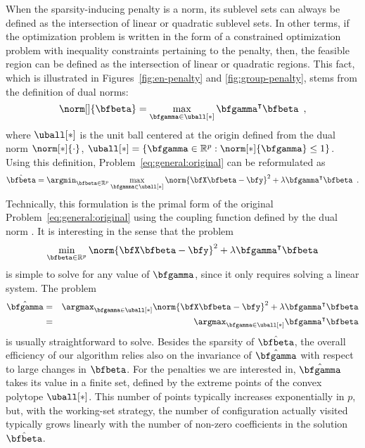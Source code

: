 When the sparsity-inducing penalty is a norm, its sublevel sets can always be
defined as the intersection of linear or quadratic sublevel sets.  In other
terms, if the optimization problem is written in the form of a constrained
optimization problem with inequality constraints pertaining to the penalty,
then, the feasible region can be defined as the intersection of linear or
quadratic regions. 
This fact, which is illustrated in Figures~\ref{fig:en-penalty} and
\ref{fig:group-penalty}, stems from the definition of dual norms:
%
\begin{equation*}%
  \norm[]{\bfbeta} = \max_{\bfgamma\in\uball[*]} \bfgamma^\intercal \bfbeta
  \enspace,
\end{equation*}
where $\uball[*]$ is the unit ball centered at the origin defined from the dual
norm $\norm[*]{\cdot}$,
$\uball[*]=\left\{\bfgamma\in\mathbb{R}^p:\norm[*]{\bfgamma}\leq 1\right\}$.
Using this definition, Problem~\eqref{eq:general:original} can be reformulated
as
%
\begin{equation}\label{eq:general:primal}
  \hat{\bfbeta} = \argmin_{\bfbeta\in\mathbb{R}^p} 
  \max_{\bfgamma\in\uball[*]}
    \norm{\bfX \bfbeta - \bfy}^2 + 
    \lambda \bfgamma^\intercal \bfbeta
  \enspace. 
\end{equation}
%
Technically, this formulation is the primal form of the original 
Problem~\eqref{eq:general:original} using the coupling function defined by the 
dual norm \citep[see e.g.][]{Gilbert16, Bonnans06}. 
It is interesting in the sense that the problem
%
\begin{equation*}
  \min_{\bfbeta\in\mathbb{R}^p} 
  \norm{\bfX \bfbeta - \bfy}^2 + 
  \lambda \bfgamma^\intercal \bfbeta
\end{equation*}
%
is simple to solve for any value of $\bfgamma$, since it only requires solving 
a linear system.
The problem
%
\begin{eqnarray}
  \hat{\bfgamma} & = & \argmax_{\bfgamma\in\uball[*]}
    \norm{\bfX \bfbeta - \bfy}^2 + 
    \lambda \bfgamma^\intercal \bfbeta \nonumber \\
     & = & \argmax_{\bfgamma\in\uball[*]}
    \bfgamma^\intercal \bfbeta \label{eq:optimal_gamma}
\end{eqnarray}
%
is usually straightforward to solve.
Besides the sparsity of $\hat{\bfbeta}$, the overall efficiency of our algorithm
relies also on the invariance of $\hat{\bfgamma}$ with respect to
large changes in $\bfbeta$. 
For the penalties we are interested in, $\hat{\bfgamma}$ takes its value in a
finite set, defined by the extreme points of the convex polytope $\uball[*]$.
This number of points typically increases exponentially in $p$, but, with the working-set
strategy, the number of configuration actually visited typically grows linearly
with the number of non-zero coefficients in the solution $\hat{\bfbeta}$.

